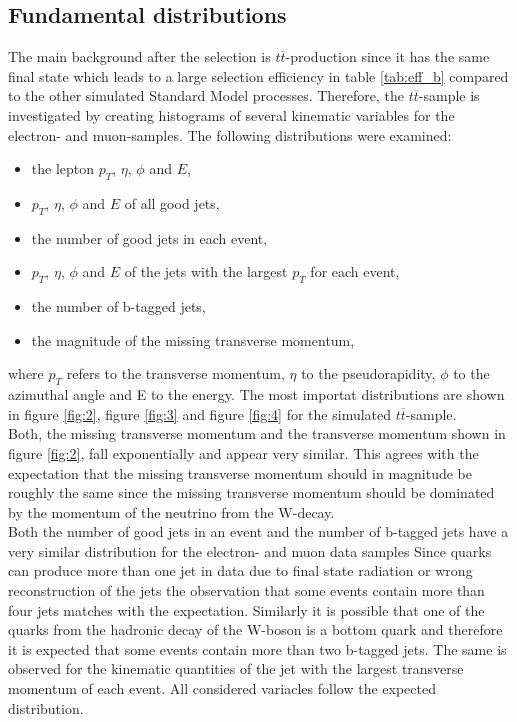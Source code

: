 \begin{table}[H]
  \end{table}


\subsection{Fundamental distributions} \label{sec:sekunde}
The main background after the selection is $t \overline{t}$-production since it has the same final state which leads to a large selection efficiency 
in table \ref{tab:eff_b} compared to the other simulated Standard Model processes. 
Therefore, the $t \overline{t}$-sample is investigated by creating 
histograms of several kinematic variables for the electron- and muon-samples. 
The following distributions were examined:
\begin{itemize}
  \item the lepton $p_T$, $\eta$, $\phi$ and $E$,
  \item $p_T$, $\eta$, $\phi$ and $E$ of all good jets,
  \item the number of good jets in each event,
  \item $p_T$, $\eta$, $\phi$ and $E$ of the jets with the largest $p_T$ for each event,
  \item the number of b-tagged jets,
  \item the magnitude of the missing transverse momentum,
\end{itemize}
where $p_T$ refers to the transverse momentum, $\eta$ to the pseudorapidity, $\phi$ to the azimuthal angle and E to the energy. 
The most importat distributions are shown in figure \ref{fig:2}, figure \ref{fig:3} and figure \ref{fig:4} for the simulated $t\overline{t}$-sample. \\
Both, the missing transverse momentum and the transverse momentum shown in figure \ref{fig:2}, fall exponentially and appear very similar. 
This agrees with the expectation that the missing transverse momentum should in magnitude be roughly the same since the missing 
transverse momentum should be dominated by the momentum of the neutrino from the W-decay. \\
Both the number of good jets in an event and the number of b-tagged jets have a very similar distribution for the electron- and muon data samples
Since quarks can produce more than one jet in data due to final state radiation or wrong reconstruction of the jets the observation that some 
events contain more than four jets matches with the expectation. 
Similarly it is possible that one of the quarks from the hadronic decay of the W-boson is a bottom quark and therefore it is expected that some events 
contain more than two b-tagged jets. 
The same is observed for the kinematic quantities of the jet with the largest transverse momentum of each event. All considered variacles follow 
the expected distribution. 

